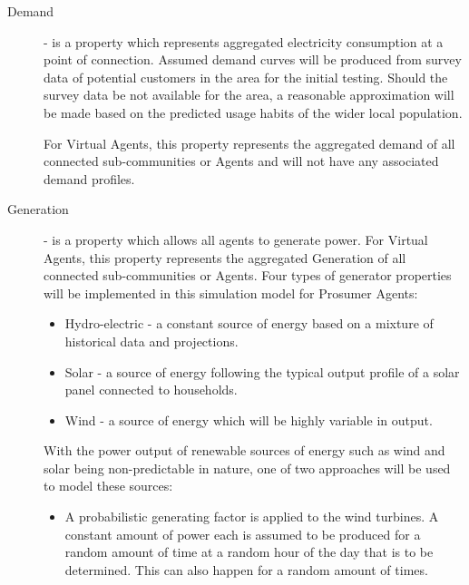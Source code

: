 \begin{description}
\item[Demand] - is a property which represents aggregated electricity consumption at a point of connection. Assumed demand curves will be produced from survey data of potential customers in the area for the initial testing. Should the survey data be not available for the area, a reasonable approximation will be made based on the predicted usage habits of the wider local population.

For Virtual Agents, this property represents the aggregated demand of all connected sub-communities or Agents and will not have any associated demand profiles.

\item[Generation] - is a property which allows all agents to generate power. For Virtual Agents, this property represents the aggregated Generation of all connected sub-communities or Agents. Four types of generator properties will be implemented in this simulation model for Prosumer Agents: 

\begin{itemize}
  \item Hydro-electric - a constant source of energy based on a mixture of historical data and projections.
  \item Solar - a source of energy following the typical output profile of a solar panel connected to households.
  \item Wind - a source of energy which will be highly variable in output.
\end{itemize}

With the power output of renewable sources of energy such as wind and solar being non-predictable in nature, one of two approaches will be used to model these sources:
\begin{itemize}
  
  \item A probabilistic generating factor is applied to the wind turbines. A constant amount of power each is assumed to be produced for a random amount of time at a random hour of the day that is to be determined. This can also happen for a random amount of times.
  

\end{itemize}
\end{description}
